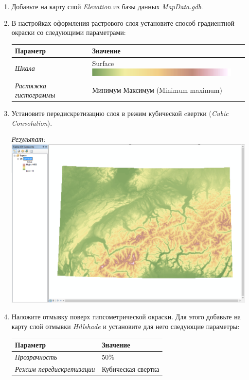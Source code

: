 \documentclass[]{book}
\theoremstyle{definition}
\theoremstyle{definition}
\theoremstyle{definition}
\theoremstyle{remark}
\begin{document}
\begin{enumerate}
\def\labelenumi{\arabic{enumi}.}
\item
  Добавьте на карту слой \emph{Elevation} из базы данных
  \emph{MapData.gdb}.
\item
  В настройках оформления растрового слоя установите способ градиентной
  окраски со следующими параметрами:

  \begin{longtable}[]{@{}ll@{}}
  \toprule
  Параметр & Значение\tabularnewline
  \midrule
  \endhead
  \emph{Шкала} & Surface
  \includegraphics{images/Ex04/image11.png}\tabularnewline
  \emph{Растяжка гистограммы} & Минимум-Максимум
  (Minimum-maximum)\tabularnewline
  \bottomrule
  \end{longtable}
\item
  Установите передискретизацию слоя в режим кубической cвертки
  (\emph{Cubic Convolution}).

  \emph{Результат:} \includegraphics{images/Ex04/image12.png}
\item
  Наложите отмывку поверх гипсометрической окраски. Для этого добавьте
  на карту слой отмывки \emph{Hillshade} и установите для него следующие
  параметры:

  \begin{longtable}[]{@{}ll@{}}
  \toprule
  Параметр & Значение\tabularnewline
  \midrule
  \endhead
  \emph{Прозрачность} & 50\%\tabularnewline
  \emph{Режим передискретизации} & Кубическая свертка\tabularnewline
  \bottomrule
  \end{longtable}


\end{enumerate}
\end{document}

